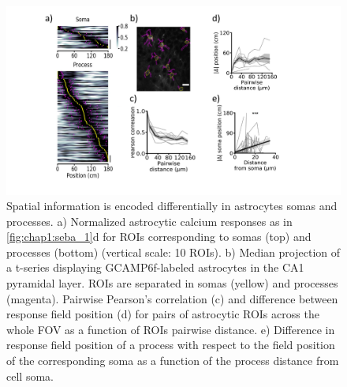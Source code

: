 \begin{figure}
    \centering
    \includegraphics[trim={110 40 130 0},clip,width=\textwidth]{Figures/Chapter1/intro_fig_seba_2.pdf}
    \caption{Spatial information is encoded differentially in astrocytes somas and processes. a) Normalized astrocytic calcium responses as in \ref{fig:chap1:seba_1}d for ROIs corresponding to somas (top) and processes (bottom) (vertical scale: 10 ROIs). b) Median projection of a t-series displaying GCAMP6f-labeled astrocytes in the CA1 pyramidal layer. ROIs are separated in somas (yellow) and processes (magenta). Pairwise Pearson’s correlation (c) and difference between response field position (d) for pairs of astrocytic ROIs across the whole FOV as a function of ROIs pairwise distance. e) Difference in response field position of a process with respect to the field position of the corresponding soma as a function of the process distance from cell soma.}
    \label{fig:chap1:seba_2}
\end{figure}
